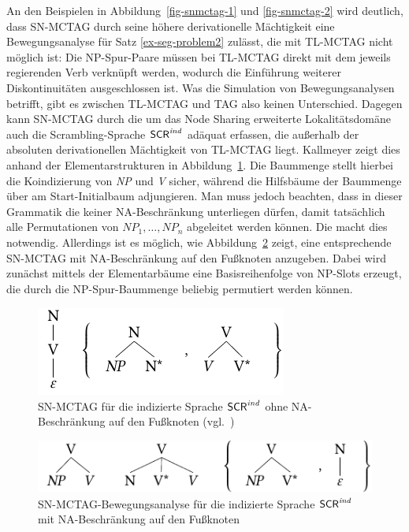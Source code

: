 An den Beispielen in Abbildung~\ref{fig-snmctag-1} und \ref{fig-snmctag-2} wird deutlich, dass SN-MCTAG durch seine höhere derivationelle Mächtigkeit eine Bewegungsanalyse für Satz \ref{ex-seg-problem2} zulässt, die mit TL-MCTAG nicht möglich ist: Die NP-Spur-Paare müssen bei TL-MCTAG direkt mit dem jeweils regierenden Verb verknüpft werden, wodurch die Einführung weiterer Diskontinuitäten ausgeschlossen ist. Was die Simulation von Bewegungsanalysen betrifft, gibt es zwischen TL-MCTAG und TAG also keinen Unterschied. Dagegen kann SN-MCTAG durch die um das Node Sharing erweiterte Lokalitätsdomäne auch die Scrambling-Sprache $\mathsf{SCR}^{\mathit{ind}}$ adäquat erfassen, die au\ss erhalb der absoluten derivationellen Mächtigkeit von TL-MCTAG liegt. Kallmeyer zeigt dies anhand der Elementarstrukturen in Abbildung~\ref{fig-snmctag-3}. Die Baummenge stellt hierbei die Koindizierung von \textit{NP} und \textit{V} sicher, während die Hilfsbäume der Baummenge über  am Start-Initialbaum adjungieren. Man muss jedoch beachten, dass in dieser Grammatik die  keiner NA-Beschränkung unterliegen dürfen, damit tatsächlich alle Permutationen von $\mathit{NP}_1, \ldots, \mathit{NP}_n$ abgeleitet werden können. Die  macht dies notwendig. Allerdings ist es möglich, wie Abbildung~\ref{fig-snmctag-4} zeigt, eine entsprechende SN-MCTAG mit NA-Beschränkung auf den Fu\ss knoten anzugeben. Dabei wird zunächst mittels der Elementarbäume eine Basisreihenfolge von NP-Slots erzeugt, die durch die NP-Spur-Baummenge beliebig permutiert werden können. 

\begin{figure}[t]
\centering
\includegraphics{graphics/abb617.pdf}
\caption{SN-MCTAG für die indizierte Sprache $\mathsf{SCR}^{\mathit{ind}}$ ohne NA-Beschränkung auf den Fu\ss knoten (vgl.\ \citealt[Abbildung~5]{Kallmeyer:05})\label{fig-snmctag-3}} 
\end{figure}

\begin{figure}[t]
\centering
\includegraphics{graphics/abb618.pdf}
\caption{SN-MCTAG-Bewegungsanalyse für die indizierte Sprache $\mathsf{SCR}^{\mathit{ind}}$  mit NA-Beschränkung auf den Fu\ss knoten\label{fig-snmctag-4}}
\end{figure}

